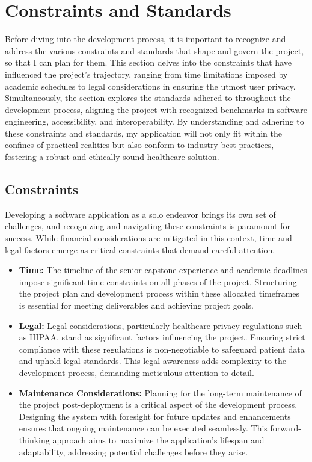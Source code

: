 \chapter{Constraints and Standards}

Before diving into the development process, it is important to recognize and address the various constraints and standards that shape and govern the project, so that I can plan for them. This section delves into the constraints that have influenced the project's trajectory, ranging from time limitations imposed by academic schedules to legal considerations in ensuring the utmost user privacy. Simultaneously, the section explores the standards adhered to throughout the development process, aligning the project with recognized benchmarks in software engineering, accessibility, and interoperability. By understanding and adhering to these constraints and standards, my application will not only fit within the confines of practical realities but also conform to industry best practices, fostering a robust and ethically sound healthcare solution.

\section{Constraints}

Developing a software application as a solo endeavor brings its own set of challenges, and recognizing and navigating these constraints is paramount for success. While financial considerations are mitigated in this context, time and legal factors emerge as critical constraints that demand careful attention.

\begin{itemize}
    \item \textbf{Time:} The timeline of the senior capstone experience and academic deadlines impose significant time constraints on all phases of the project. Structuring the project plan and development process within these allocated timeframes is essential for meeting deliverables and achieving project goals.
    \item \textbf{Legal:} Legal considerations, particularly healthcare privacy regulations such as HIPAA, stand as significant factors influencing the project. Ensuring strict compliance with these regulations is non-negotiable to safeguard patient data and uphold legal standards. This legal awareness adds complexity to the development process, demanding meticulous attention to detail.
    \item \textbf{Maintenance Considerations:} Planning for the long-term maintenance of the project post-deployment is a critical aspect of the development process. Designing the system with foresight for future updates and enhancements ensures that ongoing maintenance can be executed seamlessly. This forward-thinking approach aims to maximize the application's lifespan and adaptability, addressing potential challenges before they arise.
\end{itemize}

